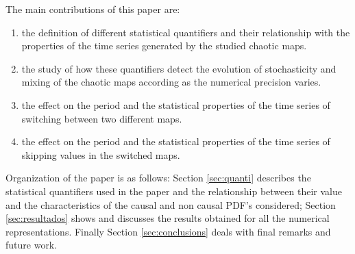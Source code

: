 The main contributions of this paper are:
\begin{enumerate}
\item the definition of different statistical quantifiers and their relationship with the properties of the time series generated by the studied chaotic maps.
\item the study of how these quantifiers detect the evolution of stochasticity and mixing of the chaotic maps according as the numerical precision varies.
\item the effect on the period and the statistical properties of the time series of switching between two different maps.
\item the effect on the period and the statistical properties of the time series of skipping values in the switched maps.
\end{enumerate}

Organization of the paper is as follows:
Section \ref{sec:quanti} describes the statistical quantifiers used in the paper and the relationship between their value and the characteristics of the causal and non causal PDF's considered;
Section \ref{sec:resultados} shows and discusses the results obtained for all the numerical representations.
Finally Section \ref{sec:conclusions} deals with final remarks and future work.